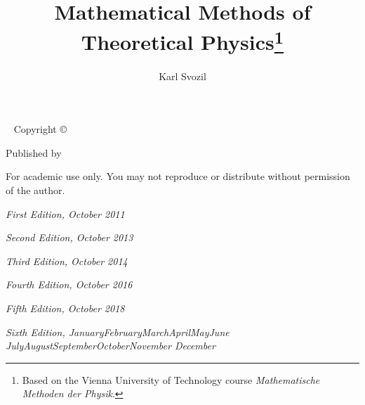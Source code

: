 \documentclass[a4paper]{tufte-book}
\title{Mathematical Methods of Theoretical Physics\thanks{Based on the Vienna University of Technology course {\em Mathematische Methoden der Physik}.}}
\author[Karl Svozil]{Karl Svozil}
\renewcommand{\smallcaps}[1]{\color{Grey} \sffamily #1}
\newcommand{\monthyear}{%
  \ifcase\month\or January\or February\or March\or April\or May\or June\or
  July\or August\or September\or October\or November\or
  December\fi\space\number\year
}
\newcommand{\blankpage}{\newpage\hbox{}\thispagestyle{empty}\newpage}
\begin{document}
\sloppy







\maketitle


\newpage
\begin{fullwidth}
~\vfill
\thispagestyle{empty}
\setlength{\parindent}{0pt}
\setlength{\parskip}{\baselineskip}
%
%
\ifcolor
%
%
Copyright \copyright\ \the\year\ \thanklessauthor

\par\smallcaps{Published by \thanklesspublisher}

\par For academic use only. You may not reproduce or distribute without permission of the author.

\par\textit{First Edition, October 2011}
\par\textit{Second Edition, October 2013}
\par\textit{Third Edition, October 2014}
\par\textit{Fourth Edition, October 2016}
\par\textit{Fifth Edition, October 2018}
\par\textit{Sixth Edition, \monthyear}
%
%
\fi
%
%
\end{fullwidth}



\tableofcontents











\mainmatter
\thispagestyle{fancy}



\cleardoublepage
\setcounter{page}{1}
%
\end{document}
